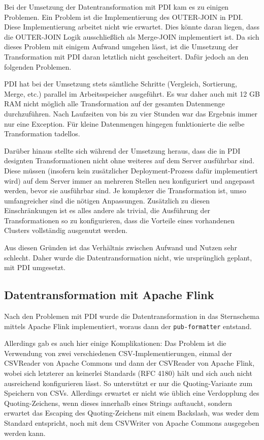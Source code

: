 \documentclass[a4paper,11pt,utf8]{scrartcl}
\begin{document}
Bei der Umsetzung der Datentransformation mit PDI kam es zu einigen Problemen. Ein Problem ist die Implementierung des OUTER-JOIN in PDI. Diese Implementierung arbeitet nicht wie erwartet. Dies könnte daran liegen, dass die OUTER-JOIN Logik ausschließlich als Merge-JOIN implementiert ist. Da sich dieses Problem mit einigem Aufwand umgehen lässt, ist die Umsetzung der Transformation mit PDI daran letztlich nicht gescheitert. Dafür jedoch an den folgenden Problemen.

PDI hat bei der Umsetzung stets sämtliche Schritte (Vergleich, Sortierung, Merge, etc.) parallel im Arbeitsspeicher ausgeführt. Es war daher auch mit 12 GB RAM nicht möglich alle Transformation auf der gesamten Datenmenge durchzuführen. Nach Laufzeiten von bis zu vier Stunden war das Ergebnis immer nur eine Exception. Für kleine Datenmengen hingegen funktionierte die selbe Transformation tadellos.

Darüber hinaus stellte sich während der Umsetzung heraus, dass die in PDI designten Transformationen nicht ohne weiteres auf dem Server ausführbar sind. Diese müssen (insofern kein zusätzlicher Deployment-Prozess dafür implementiert wird) auf dem Server immer an mehreren Stellen neu konfiguriert und angepasst werden, bevor sie ausführbar sind. Je komplexer die Transformation ist, umso umfangreicher sind die nötigen Anpassungen. Zusätzlich zu diesen Einschränkungen ist es alles andere als trivial, die Ausführung der Transformationen so zu konfigurieren, dass die Vorteile eines vorhandenen Clusters vollständig ausgenutzt werden.

Aus diesen Gründen ist das Verhältnis zwischen Aufwand und Nutzen sehr schlecht. Daher wurde die Datentransformation nicht, wie ursprünglich geplant, mit PDI umgesetzt.

\subsection{Datentransformation mit Apache Flink}

Nach den Problemen mit PDI wurde die Datentransformation in das Sternschema mittels Apache Flink implementiert, woraus dann der \texttt{pub-formatter} entstand.

Allerdings gab es auch hier einige Komplikationen: Das Problem ist die Verwendung von zwei verschiedenen CSV-Implementierungen, einmal der CSVReader von Apache Commons und dann der CSVReader von Apache Flink, wobei sich letzterer an keinerlei Standards (RFC 4180) hält und sich auch nicht ausreichend konfigurieren lässt. So unterstützt er nur die Quoting-Variante zum Speichern von CSVs. Allerdings erwartet er nicht wie üblich eine Verdopplung des Quoting-Zeichens, wenn dieses innerhalb eines Strings auftaucht, sondern erwartet das Escaping des Quoting-Zeichens mit einem Backslash, was weder dem Standard entspricht, noch mit dem CSVWriter von Apache Commons ausgegeben werden kann.
\end{document}
